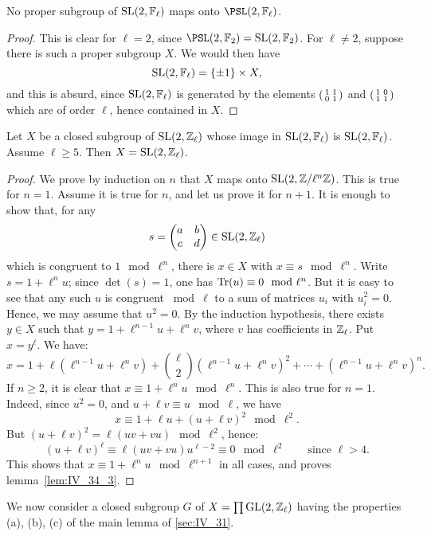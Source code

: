 \begin{lem}\label{lem:IV_34_2}
	No proper subgroup of $\operatorname{SL}(2, \mathbb{F}_\ell)$ maps onto $\PSL(2, \F_\ell)$.
\end{lem}
\begin{proof}
	This is clear for $\ell = 2$, since $\PSL(2, \F_2) = \SL(2, \F_2)$. For
	$\ell \ne 2$, suppose there is such a proper subgroup $X$. We would then
	have
	\[
		\operatorname{SL}(2, \mathbb{F}_\ell) = \{ \pm 1 \}\times X,
	\]
	and this is absurd, since $\operatorname{SL}(2, \mathbb{F}_\ell)$ is generated by the elements
	$\begin{psmallmatrix}
		1 & 1 \\
		0 & 1
	\end{psmallmatrix}$
	and
	$\begin{psmallmatrix}
		1 & 0 \\
		1 & 1
	\end{psmallmatrix}$
	which are of order $\ell$, hence contained in $X$.
\end{proof}

\begin{lem}\label{lem:IV_34_3}
	Let $X$ be a closed subgroup of $\operatorname{SL}(2, \mathbb{Z}_\ell)$ whose image
	in $\operatorname{SL}(2, \mathbb{F}_\ell)$ is $\operatorname{SL}(2, \mathbb{F}_\ell)$. Assume $\ell \ge 5$. Then $X
	= \operatorname{SL}(2, \mathbb{Z}_\ell)$.
\end{lem}
\begin{proof}
	We prove by induction on $n$ that $X$ maps onto $\operatorname{SL}(2, \mathbb{Z}/\ell^n \mathbb{Z})$.
	This is true for $n = 1$. Assume it is true for $n$, and let us prove it
	for $n+1$. It is enough to show that, for any
	\[
		s = 
		\begin{pmatrix}
			a & b \\
			c & d
		\end{pmatrix}
		\in \operatorname{SL}(2, \mathbb{Z}_\ell)
	\]
	which is congruent to $1 \mod{\ell^n}$, there is $x \in X$ with $x
	\equiv s \mod{\ell^n}$. Write $s = 1 + \ell^nu$; since $\det(s) = 1$,
	one has $\operatorname{Tr}(u) \equiv 0 \mod{\ell^n}$. But it is easy to see that any
	such $u$ is congruent $\bmod{\ell}$ to a sum of matrices $u_i$ with
	$u_i^2 = 0$. Hence, we may assume that $u^2 = 0$. By the induction
	hypothesis, there exists $y \in X$ such that $y = 1 + \ell^{n-1}u +
	\ell^n v$, where $v$ has coefficients in $\mathbb{Z}_\ell$. Put
	\dpage
	$x = y^\ell$. We have:
	\[
		x = 1 + \ell(\ell^{n-1}u + \ell^nv) +
		\binom{\ell}{2}(\ell^{n-1}u + \ell^nv)^2 + \cdots +
		(\ell^{n-1}u + \ell^nv)^n.
	\]
	If $n \ge 2$, it is clear that $x \equiv 1 + \ell^n u \mod{\ell^n}$.
	This is also true for $n = 1$. Indeed, since $u^2 = 0$, and $u + \ell v
	\equiv u \mod\ell$, we have
	\[
		x \equiv 1 + \ell u + (u + \ell v)^2 \mod{\ell^2}.
	\]
	But $(u + \ell v)^2 = \ell(uv + vu) \mod{\ell^2}$, hence:
	\[
		(u + \ell v)^\ell \equiv \ell(uv + vu)u^{\ell-2} \equiv 0
		\mod{\ell^2} \qquad \text{since } \ell > 4.
	\]
	This shows that $x \equiv 1 + \ell^n u \mod{\ell^{n+1}}$ in all cases,
	and proves lemma~\ref{lem:IV_34_3}.
\end{proof}
We now consider a closed subgroup $G$ of $X = \prod \operatorname{GL}(2, \mathbb{Z}_\ell)$ having the
properties (a), (b), (c) of the main lemma of \ref{sec:IV_31}.

